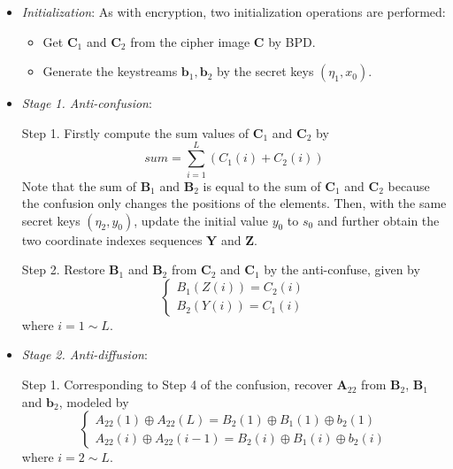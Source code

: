 \documentclass[final,3p,times,twocolumn]{elsarticle}
\begin{document}
\begin{itemize}
	
	\item \emph{Initialization}:
	As with encryption, two initialization operations are performed:
	\begin{itemize}
		\item Get $\bm{C}_1$ and $\bm{C}_2$ from the cipher image $\bm{C}$ by BPD. 
		
		\item Generate the keystreams $\bm{b}_1,\bm{b}_2$ by the secret keys $(\eta_1,x_0)$.
	\end{itemize}

	
	
	\item \emph{Stage 1. Anti-confusion}:
	
	Step 1. Firstly compute the sum values of $\bm{C}_1$ and $\bm{C}_2$ by
	\begin{equation}
	sum = \sum\limits_{i= 1}^{L} (C_1(i)+C_2(i))
	\label{eq:sum_C}
	\end{equation}
	Note that the sum of $\bm{B}_1$ and $\bm{B}_2$ is equal to the sum of $\bm{C}_1$ and $\bm{C}_2$ because the confusion only changes the positions of the elements.	Then, with the same secret keys $(\eta_2,y_0)$, update the initial value $y_0$ to $s_0$ and further obtain the two coordinate indexes sequences $\bm{Y}$ and $\bm{Z}$.
	
	Step 2. Restore $\bm{B}_1$ and $\bm{B}_2$ from $\bm{C}_2$ and $\bm{C}_1$ by the anti-confuse, given by
	\begin{equation}
	\left\{ \begin{array}{l}
	B_1(Z(i)) = C_2(i)\\
    B_2(Y(i)) = C_1(i)
	\end{array} \right.
	\label{eq:anti-confusion}
	\end{equation}
	where $i=1 \sim L$. 
	
	
	\item \emph{Stage 2. Anti-diffusion}:
	
	Step 1. Corresponding to Step 4 of the confusion, recover $\bm{A}_{22}$ from $\bm{B}_{2}$, $\bm{B}_{1}$ and $\bm{b}_{2}$, modeled by
	\begin{equation}
	\left\{ \begin{array}{l}
	A_{22}(1) \oplus A_{22}(L)  = B_2(1) \oplus B_{1}(1) \oplus b_{2}(1)\\
	A_{22}(i) \oplus A_{22}(i-1) = B_2(i) \oplus B_{1}(i) \oplus b_{2}(i)
	\end{array} \right.
	\label{eq:B2_to_A22}
	\end{equation}
	where $i=2 \sim L$.
	

\end{itemize}
\end{document}
